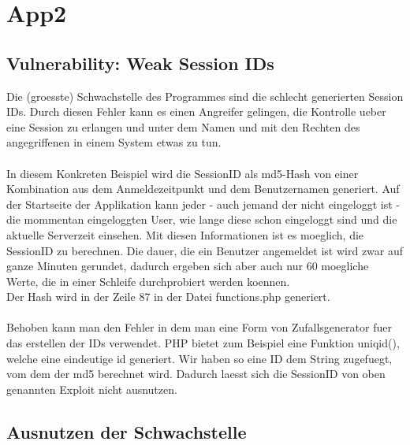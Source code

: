 \section{App2}

\subsection{Vulnerability: Weak Session IDs}

Die (groesste) Schwachstelle des Programmes sind die schlecht generierten Session IDs. Durch diesen Fehler kann es einen Angreifer gelingen, die Kontrolle ueber eine Session zu erlangen und  unter dem Namen und mit den Rechten des angegriffenen in einem System etwas zu tun.\\\\
In diesem Konkreten Beispiel wird die SessionID als md5-Hash von einer Kombination aus dem Anmeldezeitpunkt und dem Benutzernamen generiert. Auf der Startseite der Applikation kann jeder - auch jemand der nicht eingeloggt ist - die mommentan eingeloggten User, wie lange diese schon eingeloggt sind und die aktuelle Serverzeit einsehen. Mit diesen Informationen ist es moeglich, die SessionID zu berechnen. Die dauer, die ein Benutzer angemeldet ist wird zwar auf ganze Minuten gerundet, dadurch ergeben sich aber auch nur 60 moegliche Werte, die in einer Schleife durchprobiert werden koennen.\\
Der Hash wird in der Zeile 87 in der Datei functions.php generiert.\\\\
Behoben kann man den Fehler in dem man eine Form von Zufallsgenerator fuer das erstellen der IDs verwendet. PHP bietet zum Beispiel eine Funktion uniqid(), welche eine eindeutige id generiert. Wir haben so eine ID dem String zugefuegt, vom dem der md5 berechnet wird. Dadurch laesst sich die SessionID von oben genannten Exploit nicht ausnutzen.

\subsection{Ausnutzen der Schwachstelle}

